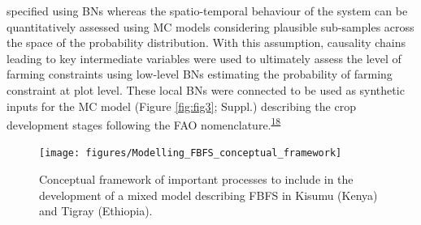 \documentclass[12pt,oneside]{article}
\begin{document}
specified using BNs whereas the spatio-temporal behaviour of the system can be quantitatively assessed using MC models considering plausible sub-samples across the space of the probability distribution. With this assumption, causality chains leading to key intermediate variables were used to ultimately assess the level of farming constraints using low-level BNs estimating the probability of farming constraint at plot level. These local BNs were connected to be used as synthetic inputs for the MC model (Figure \ref{fig:fig3}; Suppl.) describing the crop development stages following the FAO nomenclature.\textsuperscript{\protect\hyperlink{ref-Allen_et_al_1998}{18}}

\begin{figure}[!htbp]

{\centering \texttt{[image: figures/Modelling\_FBFS\_conceptual\_framework]} 

}

\caption{Conceptual framework of important processes to include in the development of a mixed model describing FBFS in Kisumu (Kenya) and Tigray (Ethiopia).}\label{fig:fig2}
\end{figure}
\end{document}

